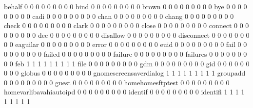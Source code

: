 \documentclass[compress,8pt]{beamer}
\begin{document}
\begin{frame}
\begin{Schunk}
  behalf                                     0   0   0   0   0   0   0   0   0
  bind                                       0   0   0   0   0   0   0   0   0
  brown                                      0   0   0   0   0   0   0   0   0
  bye                                        0   0   0   0   0   0   0   0   0
  cadi                                       0   0   0   0   0   0   0   0   0
  chan                                       0   0   0   0   0   0   0   0   0
  chang                                      0   0   0   0   0   0   0   0   0
  check                                      0   0   0   0   0   0   0   0   0
  clark                                      0   0   0   0   0   0   0   0   0
  close                                      0   0   0   0   0   0   0   0   0
  connect                                    0   0   0   0   0   0   0   0   0
  dec                                        0   0   0   0   0   0   0   0   0
  disallow                                   0   0   0   0   0   0   0   0   0
  disconnect                                 0   0   0   0   0   0   0   0   0
  eaguilar                                   0   0   0   0   0   0   0   0   0
  error                                      0   0   0   0   0   0   0   0   0
  euid                                       0   0   0   0   0   0   0   0   0
  fail                                       0   0   0   0   0   0   0   0   0
  failed                                     0   0   0   0   0   0   0   0   0
  failure                                    0   0   0   0   0   0   0   0   0
  failures                                   0   0   0   0   0   0   0   0   0
  feb                                        1   1   1   1   1   1   1   1   1
  file                                       0   0   0   0   0   0   0   0   0
  gdm                                        0   0   0   0   0   0   0   0   0
  gid                                        0   0   0   0   0   0   0   0   0
  globus                                     0   0   0   0   0   0   0   0   0
  gnomescreensaverdialog                     1   1   1   1   1   1   1   1   1
  groupadd                                   0   0   0   0   0   0   0   0   0
  guest                                      0   0   0   0   0   0   0   0   0
  homehomesftptest                           0   0   0   0   0   0   0   0   0
  homevarlibavahiautoipd                     0   0   0   0   0   0   0   0   0
  identif                                    0   0   0   0   0   0   0   0   0
  identifi                                   1   1   1   1   1   1   1   1   1

\end{Schunk}
\end{frame}
\end{document}

